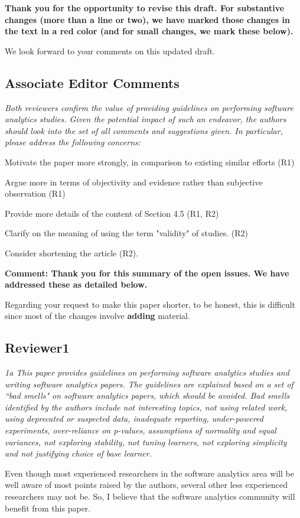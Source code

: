 {\bf Thank you for the opportunity to revise this draft. For substantive changes (more than a line or two), we have marked those changes \RED in the text in a red color \BLACK (and for small changes, we mark these below).

We look forward to your comments on this updated draft.}

\subsection*{Associate Editor Comments}


{\em Both reviewers confirm the value of providing guidelines on performing software analytics studies. Given the potential impact of such an endeavor, the authors should look into the set of all comments and suggestions given. In particular, please address the following concerns: 
\bi
\item  Motivate the paper more strongly, in comparison to existing similar efforts (R1)
\item  Argue more in terms of objectivity and evidence rather than subjective observation (R1)
\item Provide more details of the content of Section 4.5 (R1, R2)
\item Clarify on the meaning of using the term "validity" of studies. (R2)
\item Consider shortening the article (R2). 
\ei
}

{\bf Comment: Thank you for this summary of the open issues. We have addressed these as detailed below. 

Regarding  your request to make this paper shorter, to be honest, this is difficult since most of the changes involve {\bf adding} material.   }

\subsection*{Reviewer1}

{\em 1a This paper provides guidelines on performing software analytics studies and writing software analytics papers. The guidelines are explained based on a set of ``bad smells" on software analytics papers, which should be avoided. Bad smells identified by the authors include not interesting topics, not using related work, using deprecated or suspected data, inadequate reporting, under-powered experiments, over-reliance on p-values, assumptions of normality and equal variances, not exploring stability, not tuning learners, not exploring simplicity and not justifying choice of base learner.

Even though most experienced researchers in the software analytics area will be well aware of most points raised by the authors, several other less experienced researchers may not be. So, I believe that the software analytics community will benefit from this paper. }


